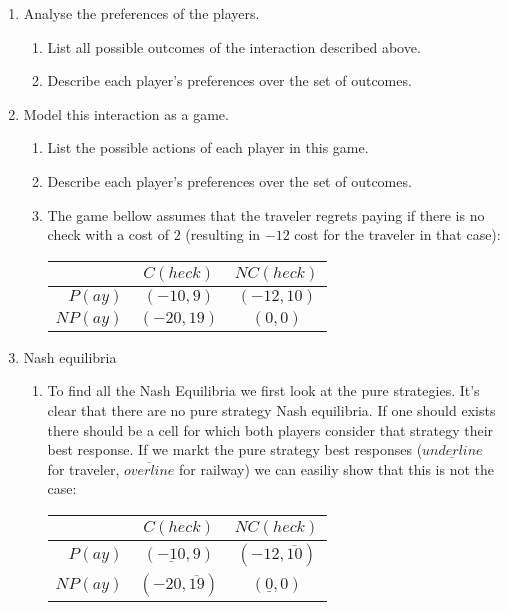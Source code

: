 \documentclass[../main.tex]{subfiles}
\begin{document}
\begin{solution}
\begin{enumerate}
	\item Analyse the preferences of the players.
	\begin{enumerate}
		\item List all possible outcomes of the interaction described above.
		\item Describe each player’s preferences over the set of outcomes.
	\end{enumerate}
	\item Model this interaction as a game.
	\begin{enumerate}
		\item List the possible actions of each player in this game.
		\item Describe each player’s preferences over the set of outcomes.
		\item The game bellow assumes that the traveler regrets paying if there is no check with a cost of $2$ (resulting in $-12$ cost for the traveler in that case):
			\begin{center}
				\begin{tabular}{|r|c|c|}
					\hline
					& $C(heck)$ & $NC(heck)$ \\
					\hline
					$P(ay)$ & $(-10,9)$ & $(-12,10)$ \\
					\hline
					$NP(ay)$ & $(-20,19)$ & $(0,0)$ \\
					\hline
				\end{tabular}
			\end{center}
	\end{enumerate}
	
	\item Nash equilibria
	\begin{enumerate}
		\item To find all the Nash Equilibria we first look at the pure strategies.
			It's clear that there are no pure strategy Nash equilibria. If one should exists there should be a cell for which both players consider that strategy their best response. If we markt the pure strategy best responses ($\underline{underline}$ for traveler, $\overline{overline}$ for railway) we can easiliy show that this is not the case:\\
		 \setlength\extrarowheight{1pt}
		 \begin{center}
			 \begin{tabular}{|r|c|c|}
				 \hline
				 & $C(heck)$ & $NC(heck)$ \\
				 \hline
				 $P(ay)$ & $(\underline{-10},9)$ & $(-12,\overline{10})$ \\ 
				 \hline
				 $NP(ay)$ & $(-20,\overline{19})$ & $(\underline{0},0)$ \\ 
				 \hline
			 \end{tabular}
		 \end{center}


\end{enumerate}
\end{enumerate}
\end{solution}
\end{document}
